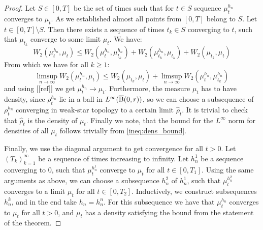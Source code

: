 \begin{proof}
Let $ S \in [0,T]$ be the set of times such that for $t \in S$ sequence $\mu_{t}^{h_n}$ converges to $\mu_t$. As we established almost all points from $[0,T]$ belong to $S$. Let $ t \in [0,T] \setminus S$. Then there exists a sequence of times $t_k \in S$ converging to $t$, such that $\mu_{t_k}$ converge to some limit $\mu_t$. We have:
\[
W_2(\mu_t^{h_n}, \mu_t) \leq W_2(\mu_{t}^{h_n}, \mu_{t_k}^{h_n}) + W_2(\mu_{t_k}^{h_n}, \mu_{t_k}) + W_2(\mu_{t_k}, \mu_t)
\]
From which we have for all $k \geq 1$:
\[
\limsup_{n \rightarrow \infty} W_2(\mu_{t}^{h_n}, \mu_t) \leq W_2(\mu_{t_k}, \mu_t) + \limsup_{n\rightarrow \infty} W_2(\mu_t^{h_n}, \mu_{t_k}^{h_n})
\]
and using [[ref]] we get $\mu_{t}^{h_n} \rightarrow \mu_t$. Furthermore, the measure $\mu_t$ has to have density, since $\rho_{t}^{h_n}$ lie in a ball in $L^{\infty}(\operatorname{\overline{B}}(0,r))$, so we can choose a subsequence of $\rho_t^{h_n}$ converging in weak-star topology to a certain limit $\hat{\rho}_t$. It is trivial to check that $\hat{\rho}_t$ is the density of $\mu_t$. Finally we note, that the bound for the $L^{\infty}$ norm for densities of all $\mu_t$ follows trivially from \ref{ineq:dens_bound}.

Finally, we use the diagonal argument to get convergence for all $t >0$. Let $(T_k)_{k=1}^{\infty}$ be a sequence of times increasing to infinity. Let $h_{n}^1$ be a sequence converging to $0$, such that $\mu_t^{h_n^1}$ converge to $\mu_t$ for all $t \in [0, T_1]$. Using the same arguments as above, we can choose a subsequence $h_n^2$ of $h_n^1$, such that $\mu_{t}^{h_n^2}$ converges to a limit $\mu_t$ for all $t \in [0, T_2]$. Inductively, we construct subsequences $h_{n}^k$, and in the end take $h_n = h_n^n$. For this subsequence we have that $\mu_t^{h_n}$ converges to $\mu_t$ for all $t > 0$, and $\mu_t$ has a density satisfying the bound from the statement of the theorem.
\end{proof}

